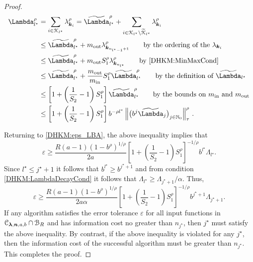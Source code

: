 \documentclass[USenglish]{article}
\theoremstyle{dgthm}
\theoremstyle{dgthm}
\theoremstyle{dgthm}
\theoremstyle{dgthm}
\theoremstyle{dgdef}
\theoremstyle{definition}
\newcommand{\DHKMtcalK}{\widetilde{\calK}}
\newcommand{\DHKMinc}{\textup{in}}
\newcommand{\DHKMout}{\textup{out}}
\newcommand{\DHKMnorm}[2][{}]{\ensuremath{\left \lVert #2 \right \rVert}_{#1}}
\newcommand{\tLambda}{\widetilde{\Lambda}}
\begin{document}
\begin{proof}
\begin{align*}
    \Lambda_{l^\star}^\rho & = \sum_{i \in \calK_{l^\star}} \lambda_{\bsk_i}^{\rho} =  \tLambda_{l^\star}^\rho + \sum_{i \in \calK_{l^\star} \setminus \DHKMtcalK_{l^\star}} \lambda_{\bsk_i}^{\rho}
    \\
    &\le  \tLambda_{l^\star}^\rho + m_{\DHKMout} \lambda_{\bsk_{n_{l^\star -1}+1}}^\rho \qquad \text{by the ordering of the } \lambda_{\bsk_i}\\
    &\le  \tLambda_{l^\star}^\rho + m_{\DHKMout} S_1^\rho \lambda_{\bsk_{n_{l^\star}}}^\rho \qquad \text{by \eqref{DHKM:MinMaxCond}}\\
    & \le \tLambda_{l^\star}^\rho + \frac{m_{\DHKMout}}{m_{\DHKMinc}} S_1^\rho \tLambda_{l^\star}^\rho \qquad \text{by the definition of } \tLambda_{l^\star}\\
    & \le \left[1 + \left(\frac 1 {S_2} -1 \right) S_1^\rho \right] \tLambda_{l^\star}^\rho \qquad \text{by the bounds on } m_{\DHKMinc} \text{ and } m_{\DHKMout} 
    \\
    & \le \left[1 + \left(\frac 1 {S_2} -1 \right) S_1^\rho \right] b^{-\rho l^\star} \DHKMnorm[\tau]{\bigl(b^{j} \tLambda_j \bigr)_{j \in \N_0}}^\rho\, .
\end{align*}

Returning to \eqref{DHKM:eps_LBA}, the above inequality  implies that
\begin{equation*}
    \varepsilon 
\ge  \frac{R(a-1)(1 - b^\rho)^{1/\rho}}{2a} \left[1 + \left(\frac 1 {S_2} -1 \right) S_1^\rho \right]^{-1/\rho} b^{l^\star} \Lambda_{l^\star}.
\end{equation*}
Since $l^\star \le j^{\star}+1$ it follows that $ b^{l^\star} \ge b^{j^\star+1}$ and from condition \eqref{DHKM:LambdaDecayCond} it follows that $\Lambda_{l^\star} \ge \Lambda_{j^\star+1}/\alpha$.  Thus,
\begin{equation*}
    \varepsilon 
\ge  \frac{R(a-1)(1 - b^\rho)^{1/\rho}}{2a\alpha} \left[1 + \left(\frac 1 {S_2} -1 \right) S_1^\rho \right]^{-1/\rho} b^{j^\star+1} \Lambda_{j^\star+1}.
\end{equation*}
If any algorithm satisfies the error tolerance $\varepsilon$ for all input functions in ${\mathcal{C}}_{\boldsymbol{\lambda},{\boldsymbol{n}},a,b} \cap {\mathcal{B}}_R$ and has information cost no greater than $n_{j^\star}$, then $j^\star$ must satisfy the above inequality.  By contrast, if the above inequality is violated for any $j^\star$, then the information cost of the successful algorithm must be greater than $n_{j^\star}$.  This completes the proof.
\end{proof}
\end{document}
